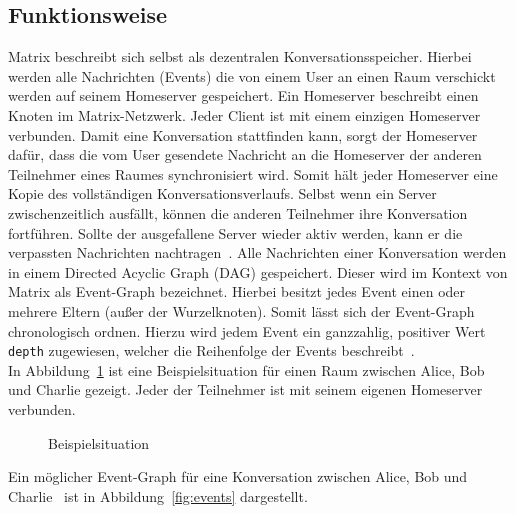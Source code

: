    \subsection{Funktionsweise}\label{subsec:funktionsweise}
    Matrix beschreibt sich selbst als dezentralen Konversationsspeicher\cite{matrix}.
    Hierbei werden alle Nachrichten (Events) die von einem User an einen Raum verschickt werden auf seinem Homeserver gespeichert.
    Ein Homeserver beschreibt einen Knoten im Matrix-Netzwerk.
    Jeder Client ist mit einem einzigen Homeserver verbunden.
    Damit eine Konversation stattfinden kann, sorgt der Homeserver dafür, dass die vom User gesendete Nachricht an die Homeserver der anderen Teilnehmer eines Raumes synchronisiert wird.
    Somit hält jeder Homeserver eine Kopie des vollständigen Konversationsverlaufs.
    Selbst wenn ein Server zwischenzeitlich ausfällt, können die anderen Teilnehmer ihre Konversation fortführen.
    Sollte der ausgefallene Server wieder aktiv werden, kann er die verpassten Nachrichten nachtragen~\cite{matrix}.
    Alle Nachrichten einer Konversation werden in einem Directed Acyclic Graph (DAG) gespeichert.
    Dieser wird im Kontext von Matrix als Event-Graph bezeichnet.
    Hierbei besitzt jedes Event einen oder mehrere Eltern (außer der Wurzelknoten).
    Somit lässt sich der Event-Graph chronologisch ordnen.
    Hierzu wird jedem Event ein ganzzahlig, positiver Wert \texttt{depth} zugewiesen, welcher die Reihenfolge der Events beschreibt~\cite{eventgraph}.\\
    In Abbildung~\ref{fig:matrixfunktionsweise} ist eine Beispielsituation für einen Raum zwischen Alice, Bob und Charlie gezeigt.
    Jeder der Teilnehmer ist mit seinem eigenen Homeserver verbunden.
    \begin{figure}[h]
        \centering
        
        \caption{Beispielsituation}
        \label{fig:matrixfunktionsweise}
    \end{figure}
    \newpage
    Ein möglicher Event-Graph für eine Konversation zwischen Alice, Bob und Charlie~\cite{matrix} ist in Abbildung~\ref{fig:events} dargestellt.
